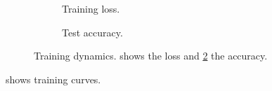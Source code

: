 \begin{figure}[t]
  \centering
  \begin{subfigure}[b]{0.48\linewidth}
    \centering
    \caption{Training loss.}
    \label{fig:loss}
  \end{subfigure}
  \hfill
  \begin{subfigure}[b]{0.48\linewidth}
    \centering
    \caption{Test accuracy.}
    \label{fig:acc}
  \end{subfigure}
  \caption{Training dynamics.  shows the loss and \cref{fig:acc} the accuracy.}
  \label{fig:dynamics}
\end{figure}

 shows training curves.
